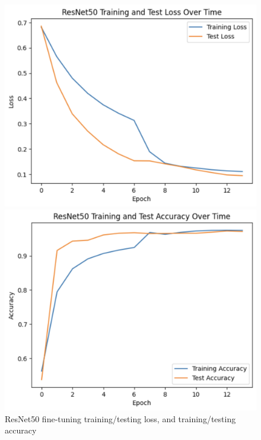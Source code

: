 \documentclass[twocolumn]{article}
\begin{document}
\begin{figure}[H]
\centering
\begin{minipage}{8cm}
\includegraphics[width=\textwidth]{images/resnetloss.png}
\end{minipage} \begin{minipage}{8cm}
\includegraphics[width=\textwidth]{images/resnetacc.png}
\end{minipage}
\caption{ResNet50 fine-tuning training/testing loss, and training/testing accuracy}
\label{fig:resnet50training}
\end{figure}
\end{document}
